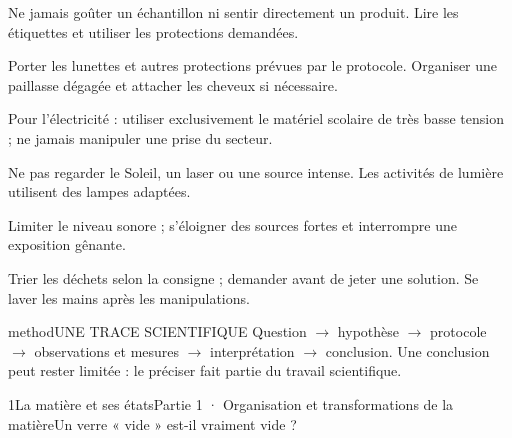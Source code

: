 \documentclass[12pt,twoside,openany]{book}
\begin{document}
\begin{questions}
\item Ne jamais goûter un échantillon ni sentir directement un produit. Lire les étiquettes et utiliser les protections demandées.
\item Porter les lunettes et autres protections prévues par le protocole. Organiser une paillasse dégagée et attacher les cheveux si nécessaire.
\item Pour l’électricité : utiliser exclusivement le matériel scolaire de très basse tension ; ne jamais manipuler une prise du secteur.
\item Ne pas regarder le Soleil, un laser ou une source intense. Les activités de lumière utilisent des lampes adaptées.
\item Limiter le niveau sonore ; s’éloigner des sources fortes et interrompre une exposition gênante.
\item Trier les déchets selon la consigne ; demander avant de jeter une solution. Se laver les mains après les manipulations.
\end{questions}
\begin{pcEncadre}{method}{UNE TRACE SCIENTIFIQUE}
Question \(\rightarrow\) hypothèse \(\rightarrow\) protocole \(\rightarrow\) observations et mesures \(\rightarrow\) interprétation \(\rightarrow\) conclusion. Une conclusion peut rester limitée : le préciser fait partie du travail scientifique.\par
\end{pcEncadre}
\clearpage\pagestyle{otMain}
\begin{ouverture}[college1]{1}{La matière et ses états}{Partie 1 · Organisation et transformations de la matière}{Un verre « vide » est-il vraiment vide ?}
\end{ouverture}
\label{ch-1-etats}
\label{ess-1}
\end{document}
